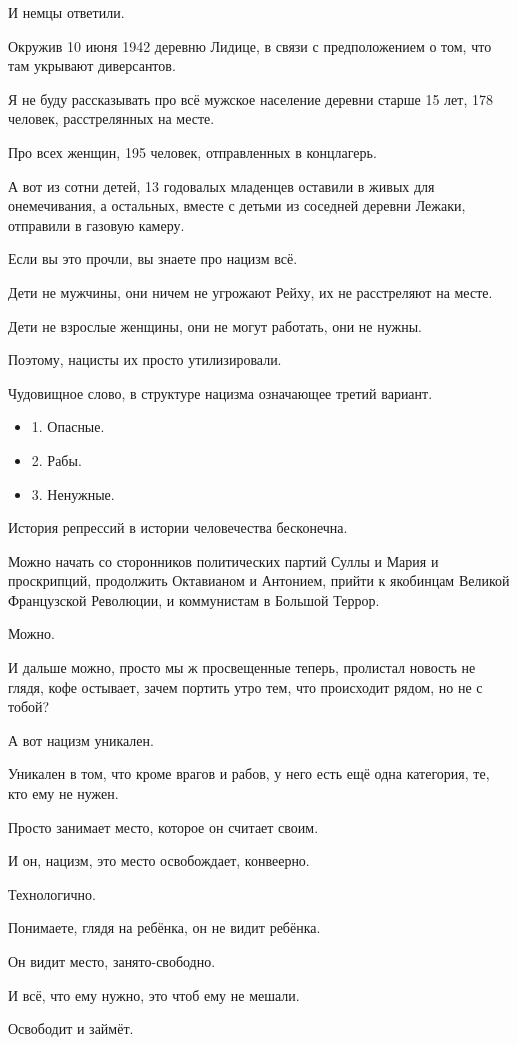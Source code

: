 И немцы ответили.

Окружив 10 июня 1942 деревню Лидице, в связи с предположением о том, что там укрывают диверсантов.

Я не буду рассказывать про всё мужское население деревни старше 15 лет, 178
человек, расстрелянных на месте.

Про всех женщин, 195 человек, отправленных в концлагерь.

А вот из сотни детей, 13 годовалых младенцев оставили в живых для онемечивания,
а остальных, вместе с детьми из соседней деревни Лежаки, отправили в газовую
камеру.

Если вы это прочли, вы знаете про нацизм всё.

Дети не мужчины, они ничем не угрожают Рейху, их не расстреляют на месте.

Дети не взрослые женщины, они не могут работать, они не нужны.

Поэтому, нацисты их просто утилизировали.

Чудовищное слово, в структуре нацизма означающее третий вариант.

\begin{itemize}
  \item 1.  Опасные.
  \item 2.  Рабы.
  \item 3.  Ненужные.
\end{itemize}

История репрессий в истории человечества бесконечна.

Можно начать со сторонников политических партий Суллы и Мария и проскрипций,
продолжить Октавианом и Антонием, прийти к якобинцам Великой Французской
Революции, и коммунистам в Большой Террор.

Можно.

И дальше можно, просто мы ж просвещенные теперь, пролистал новость не глядя,
кофе остывает, зачем портить утро тем, что происходит рядом, но не с тобой?

А вот нацизм уникален.

Уникален в том, что кроме врагов и рабов, у него есть ещё одна категория, те, кто ему не нужен.

Просто занимает место, которое он считает своим.

И он, нацизм, это место освобождает, конвеерно.

Технологично.

Понимаете, глядя на ребёнка, он не видит ребёнка.

Он видит место, занято-свободно.

И всё, что ему нужно, это чтоб ему не мешали.

Освободит и займёт.
